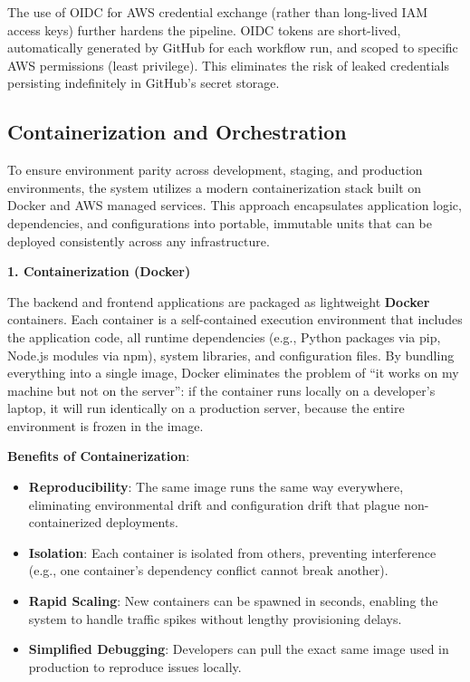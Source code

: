 The use of OIDC for AWS credential exchange (rather than long-lived IAM access keys) further hardens the pipeline. OIDC tokens are short-lived, automatically generated by GitHub for each workflow run, and scoped to specific AWS permissions (least privilege). This eliminates the risk of leaked credentials persisting indefinitely in GitHub's secret storage.

\subsection{Containerization and Orchestration}

To ensure environment parity across development, staging, and production environments, the system utilizes a modern containerization stack built on Docker and AWS managed services. This approach encapsulates application logic, dependencies, and configurations into portable, immutable units that can be deployed consistently across any infrastructure.

\textbf{1. Containerization (Docker)}

The backend and frontend applications are packaged as lightweight \textbf{Docker} containers. Each container is a self-contained execution environment that includes the application code, all runtime dependencies (e.g., Python packages via pip, Node.js modules via npm), system libraries, and configuration files. By bundling everything into a single image, Docker eliminates the problem of ``it works on my machine but not on the server'': if the container runs locally on a developer's laptop, it will run identically on a production server, because the entire environment is frozen in the image.

\textbf{Benefits of Containerization}:
\begin{itemize}
    \item \textbf{Reproducibility}: The same image runs the same way everywhere, eliminating environmental drift and configuration drift that plague non-containerized deployments.
    \item \textbf{Isolation}: Each container is isolated from others, preventing interference (e.g., one container's dependency conflict cannot break another).
    \item \textbf{Rapid Scaling}: New containers can be spawned in seconds, enabling the system to handle traffic spikes without lengthy provisioning delays.
    \item \textbf{Simplified Debugging}: Developers can pull the exact same image used in production to reproduce issues locally.
\end{itemize}


